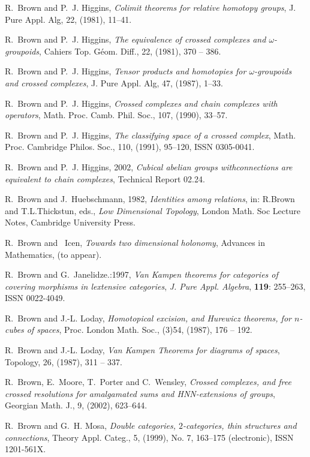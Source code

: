 \documentclass[12pt]{article}
\theoremstyle{plain}
\theoremstyle{definition}
\numberwithin{equation}{section}
\begin{document}
\begin{thebibliography}{99}
R.~Brown and P.~J. Higgins, {\em Colimit theorems for relative
homotopy groups\/}, J. Pure Appl. Alg, 22, (1981), 11--41.

R.~Brown and P.~J. Higgins, {\em The equivalence of crossed complexes and  $\omega$-groupoids}, Cahiers Top. G\'{e}om. Diff., 22, (1981), 370 -- 386.

R.~Brown and P.~J. Higgins, {\em Tensor products and homotopies
for $\omega$-groupoids and crossed complexes}, J. Pure Appl. Alg, 47, (1987),
  1--33.

R.~Brown and P.~J. Higgins, {\em Crossed complexes and chain complexes with
  operators}, Math. Proc. Camb. Phil. Soc., 107, (1990), 33--57.

R.~Brown and P.~J. Higgins, {\em The classifying space of a crossed complex},
  Math. Proc. Cambridge Philos. Soc., 110, (1991), 95--120, ISSN 0305-0041.

R.~Brown and P.~J. Higgins, 2002, {\em Cubical abelian groups withconnections are equivalent to chain complexes}, Technical Report 02.24.

R.~Brown and J.~Huebschmann, 1982, {\em Identities among
relations}, in:  R.Brown and T.L.Thickstun, eds., {\em Low Dimensional Topology}, London
  Math. Soc Lecture Notes, Cambridge University Press.

R.~Brown and ~{I}cen, {\em Towards two dimensional holonomy},
Advances in Mathematics,  (to appear).

R.~Brown and G.~Janelidze.:1997, {\em Van {K}ampen theorems for categories of covering morphisms in lextensive categories}, \emph{J. Pure Appl. Algebra}, \textbf{119}:  255--263, ISSN 0022-4049.

R.~Brown and J.-L. Loday, {\em Homotopical excision, and Hurewicz theorems, for $n$-cubes of spaces}, Proc. London Math. Soc., (3)54, (1987), 176 -- 192.

R.~Brown and J.-L. Loday, {\em Van Kampen Theorems for diagrams of spaces\/}, Topology, 26, (1987), 311 -- 337.

R.~Brown, E.~Moore, T.~Porter and C.~Wensley, {\em Crossed
complexes, and free crossed resolutions for amalgamated sums and HNN-extensions of groups},
  Georgian Math. J., 9, (2002), 623--644.

R.~Brown and G.~H. Mosa, {\em Double categories, {$2$}-categories, thin structures and connections}, Theory Appl. Categ., 5, (1999), No. 7,
  163--175 (electronic), ISSN 1201-561X.


\end{thebibliography}
\end{document}
